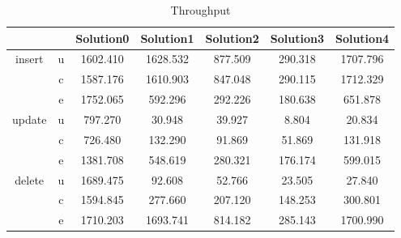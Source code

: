 \begin{table}[h]
\newcommand{\B}[1]{\colorbox{light-gray}{#1}}
 \centering
\caption{Throughput}\label{t:}
\begin{tabular}{ccccccc}
\toprule
&&Solution0 & Solution1 & Solution2 & Solution3 & Solution4\\
\midrule
\multirow{3}{*}{insert} & u & 1602.410 & 1628.532 & 877.509 & 290.318 & 1707.796\\
 & c & 1587.176 & 1610.903 & 847.048 & 290.115 & 1712.329\\
 & e & 1752.065 & 592.296 & 292.226 & 180.638 & 651.878\\
\midrule
\multirow{3}{*}{update} & u & 797.270 & 30.948 & 39.927 & 8.804 & 20.834\\
 & c & 726.480 & 132.290 & 91.869 & 51.869 & 131.918\\
 & e & 1381.708 & 548.619 & 280.321 & 176.174 & 599.015\\
\midrule
\multirow{3}{*}{delete} & u & 1689.475 & 92.608 & 52.766 & 23.505 & 27.840\\
 & c & 1594.845 & 277.660 & 207.120 & 148.253 & 300.801\\
 & e & 1710.203 & 1693.741 & 814.182 & 285.143 & 1700.990\\
\bottomrule
\end{tabular}
\end{table}



